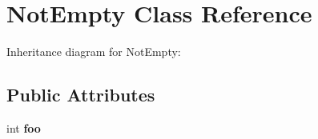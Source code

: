 \hypertarget{class_not_empty}{}\section{Not\+Empty Class Reference}
\label{class_not_empty}


Inheritance diagram for Not\+Empty\+:
\subsection*{Public Attributes}
\begin{DoxyCompactItemize}
\item 
\mbox{\label{class_not_empty_afe3057f3e5f42e4f4fd3ef6c03ba5764}} 
int {\bfseries foo}
\end{DoxyCompactItemize}


